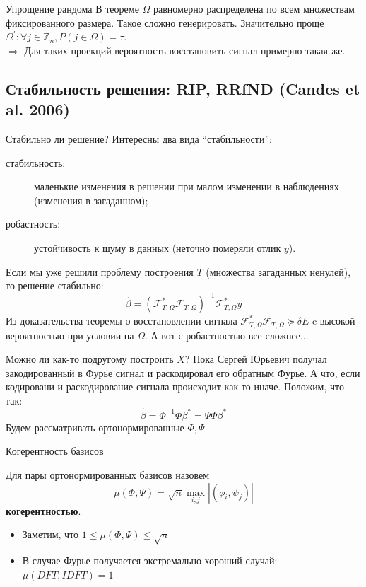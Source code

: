 \documentclass[14pt, fleqn, xcolor={dvipsnames, table}]{beamer}
\begin{document}
\begin{frame}{Упрощение рандома}
В теореме $\Omega$ равномерно распределена по всем множествам фиксированного размера. Такое сложно генерировать. Значительно проще $\Omega^{'}: \forall j \in \mathbb{Z}_n, P(j \in \Omega) = \tau$. \\
$\Rightarrow$ Для таких проекций вероятность восстановить сигнал примерно такая же.
\end{frame}

\subsection{Стабильность решения: RIP, RRfND (Candes et al. 2006)}
\begin{frame}{Стабильно ли решение?}
\small
Интересны два вида ``стабильности'':
\begin{description}
  \item[стабильность:] маленькие изменения в решении при малом изменении в наблюдениях (изменения в загаданном);
  \item[робастность:] устойчивость к шуму в данных (неточно померяли отлик $y$).
\end{description}
Если мы уже решили проблему построения $T$ (множества загаданных ненулей), то решение стабильно:
$$
\hat{\beta} = (\mathcal{F}^*_{T,\Omega}\mathcal{F}_{T,\Omega})^{-1}\mathcal{F}^*_{T,\Omega}y
$$
Из доказательства теоремы о восстановлении сигнала $\mathcal{F}^*_{T,\Omega}\mathcal{F}_{T,\Omega} \succeq \delta E$ c высокой вероятностью при условии на $\Omega$. А вот с робастностью все сложнее...
\end{frame}

\begin{frame}{Можно ли как-то подругому построить $X$?}
Пока Сергей Юрьевич получал закодированный в Фурье сигнал и раскодировал его обратным Фурье. А что, если кодировани и раскодирование сигнала происходит как-то иначе. Положим, что так:
$$
\hat{\beta} = \Phi^{-1} \Phi \beta^* = \Psi \Phi \beta^*
$$
Будем рассматривать ортонормированные $\Phi, \Psi$
\end{frame}

\begin{frame}{Когерентность базисов}
\small
\begin{definition}
Для пары ортонормированных базисов назовем
$$
\mu(\Phi, \Psi) = \sqrt{n}\max_{i,j} |(\phi_i, \psi_j)|
$$
\textbf{когерентностью}.
\end{definition}
\begin{itemize}
  \item Заметим, что $1 \le \mu(\Phi,\Psi) \le \sqrt{n}$
  \item В случае Фурье получается экстремально хороший случай: $\mu(DFT,IDFT) = 1$
\end{itemize}
\end{frame}
\end{document}
